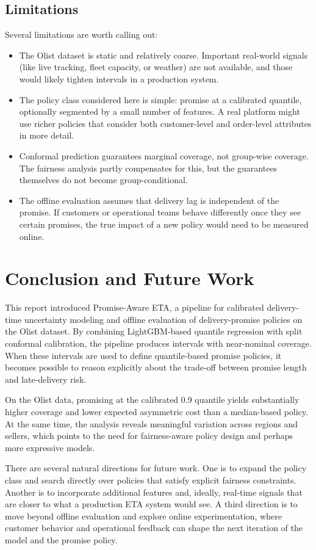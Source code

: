 \documentclass[10pt,twocolumn]{article}
\begin{document}
\subsection{Limitations}
Several limitations are worth calling out:
\begin{itemize}
  \item The Olist dataset is static and relatively coarse. Important real-world signals (like live tracking, fleet capacity, or weather) are not available, and those would likely tighten intervals in a production system.
  \item The policy class considered here is simple: promise at a calibrated quantile, optionally segmented by a small number of features. A real platform might use richer policies that consider both customer-level and order-level attributes in more detail.
  \item Conformal prediction guarantees marginal coverage, not group-wise coverage. The fairness analysis partly compensates for this, but the guarantees themselves do not become group-conditional.
  \item The offline evaluation assumes that delivery lag is independent of the promise. If customers or operational teams behave differently once they see certain promises, the true impact of a new policy would need to be measured online.
\end{itemize}

\section{Conclusion and Future Work}
This report introduced Promise-Aware ETA, a pipeline for calibrated delivery-time uncertainty modeling and offline evaluation of delivery-promise policies on the Olist dataset. By combining LightGBM-based quantile regression with split conformal calibration, the pipeline produces intervals with near-nominal coverage. When these intervals are used to define quantile-based promise policies, it becomes possible to reason explicitly about the trade-off between promise length and late-delivery risk.

On the Olist data, promising at the calibrated 0.9 quantile yields substantially higher coverage and lower expected asymmetric cost than a median-based policy. At the same time, the analysis reveals meaningful variation across regions and sellers, which points to the need for fairness-aware policy design and perhaps more expressive models.

There are several natural directions for future work. One is to expand the policy class and search directly over policies that satisfy explicit fairness constraints. Another is to incorporate additional features and, ideally, real-time signals that are closer to what a production ETA system would see. A third direction is to move beyond offline evaluation and explore online experimentation, where customer behavior and operational feedback can shape the next iteration of the model and the promise policy.
\end{document}
